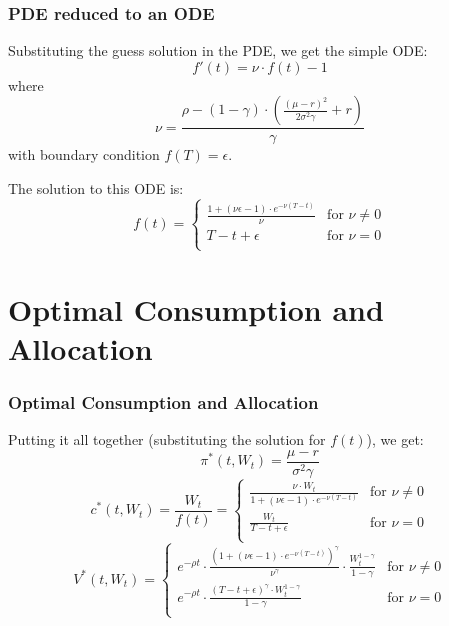 \documentclass{beamer}
\begin{document}
\begin{frame}
\frametitle{PDE reduced to an ODE}
Substituting the guess solution in the PDE, we get the simple ODE:
$$f'(t) = \nu \cdot f(t) - 1$$
where $$\nu = \frac {\rho - (1 - \gamma) \cdot (\frac {(\mu - r)^2} {2 \sigma^2 \gamma} + r)} {\gamma}$$
with boundary condition $f(T) = \epsilon$.

The solution to this ODE is:
$$
f(t) =
\begin{cases}
\frac {1 + (\nu \epsilon - 1) \cdot e^{-\nu (T-t)}} {\nu} & \text{for } \nu \neq 0 \\
T-t+\epsilon & \text{for } \nu = 0 \\
\end{cases}
$$
\end{frame}

\section{Optimal Consumption and Allocation}
\begin{frame}
\frametitle{Optimal Consumption and Allocation}
Putting it all together (substituting the solution for $f(t)$), we get:
$$\pi^*(t, W_t) = \frac {\mu - r} {\sigma^2 \gamma}$$
$$
c^*(t, W_t)= \frac {W_t} {f(t)} = 
\begin{cases}
\frac {\nu \cdot W_t} {1 + (\nu \epsilon - 1) \cdot e^{-\nu (T-t)}} & \text{for } \nu \neq 0\\
\frac {W_t} {T-t+\epsilon} & \text{for } \nu = 0\\
\end{cases}
$$
$$
V^*(t, W_t) = 
\begin{cases}
e^{-\rho t} \cdot \frac {(1 + (\nu \epsilon - 1) \cdot e^{-\nu (T-t)})^{\gamma}} {\nu^{\gamma}} \cdot \frac {W_t^{1-\gamma}} {1-\gamma} & \text{for } \nu \neq 0\\
e^{-\rho t} \cdot \frac {(T-t+\epsilon)^\gamma \cdot W_t^{1 - \gamma}} {1-\gamma} & \text{for } \nu = 0\\
\end{cases}
$$
\end{frame}
\end{document}
